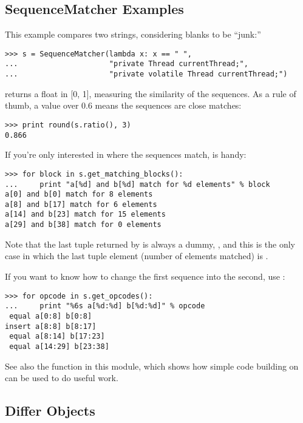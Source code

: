 \subsection{SequenceMatcher Examples \label{sequencematcher-examples}}


This example compares two strings, considering blanks to be ``junk:''

\begin{verbatim}
>>> s = SequenceMatcher(lambda x: x == " ",
...                     "private Thread currentThread;",
...                     "private volatile Thread currentThread;")
\end{verbatim}

 returns a float in [0, 1], measuring the similarity
of the sequences.  As a rule of thumb, a  value over
0.6 means the sequences are close matches:

\begin{verbatim}
>>> print round(s.ratio(), 3)
0.866
\end{verbatim}

If you're only interested in where the sequences match,
 is handy:

\begin{verbatim}
>>> for block in s.get_matching_blocks():
...     print "a[%d] and b[%d] match for %d elements" % block
a[0] and b[0] match for 8 elements
a[8] and b[17] match for 6 elements
a[14] and b[23] match for 15 elements
a[29] and b[38] match for 0 elements
\end{verbatim}

Note that the last tuple returned by  is
always a dummy, , and this is
the only case in which the last tuple element (number of elements
matched) is .

If you want to know how to change the first sequence into the second,
use :

\begin{verbatim}
>>> for opcode in s.get_opcodes():
...     print "%6s a[%d:%d] b[%d:%d]" % opcode
 equal a[0:8] b[0:8]
insert a[8:8] b[8:17]
 equal a[8:14] b[17:23]
 equal a[14:29] b[23:38]
\end{verbatim}

See also the function  in this module,
which shows how simple code building on  can be
used to do useful work.


\subsection{Differ Objects \label{differ-objects}}

